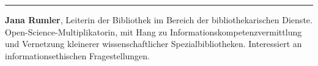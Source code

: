 \begin{center}\rule{0.5\linewidth}{\linethickness}\end{center}

\textbf{Jana Rumler}, Leiterin der Bibliothek im Bereich der
bibliothekarischen Dienste. Open-Science-Multiplikatorin, mit Hang zu
Informationskompetenzvermittlung und Vernetzung kleinerer
wissenschaftlicher Spezialbibliotheken. Interessiert an
informationsethischen Fragestellungen.

